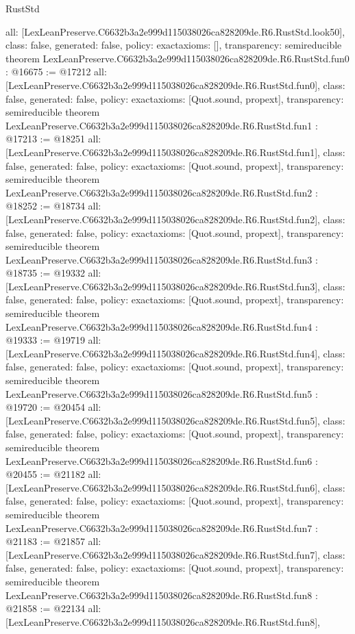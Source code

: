 \begin{lexlean}{RustStd}
\begin{coremodule}
{  all: [LexLeanPreserve.C6632b3a2e999d115038026ca828209de.R6.RustStd.look50],
  class: false,
  generated: false,
  policy: exact{axioms: []},
  transparency: semireducible
}
theorem LexLeanPreserve.C6632b3a2e999d115038026ca828209de.R6.RustStd.fun0 : @16675 := @17212 {
  all: [LexLeanPreserve.C6632b3a2e999d115038026ca828209de.R6.RustStd.fun0],
  class: false,
  generated: false,
  policy: exact{axioms: [Quot.sound, propext]},
  transparency: semireducible
}
theorem LexLeanPreserve.C6632b3a2e999d115038026ca828209de.R6.RustStd.fun1 : @17213 := @18251 {
  all: [LexLeanPreserve.C6632b3a2e999d115038026ca828209de.R6.RustStd.fun1],
  class: false,
  generated: false,
  policy: exact{axioms: [Quot.sound, propext]},
  transparency: semireducible
}
theorem LexLeanPreserve.C6632b3a2e999d115038026ca828209de.R6.RustStd.fun2 : @18252 := @18734 {
  all: [LexLeanPreserve.C6632b3a2e999d115038026ca828209de.R6.RustStd.fun2],
  class: false,
  generated: false,
  policy: exact{axioms: [Quot.sound, propext]},
  transparency: semireducible
}
theorem LexLeanPreserve.C6632b3a2e999d115038026ca828209de.R6.RustStd.fun3 : @18735 := @19332 {
  all: [LexLeanPreserve.C6632b3a2e999d115038026ca828209de.R6.RustStd.fun3],
  class: false,
  generated: false,
  policy: exact{axioms: [Quot.sound, propext]},
  transparency: semireducible
}
theorem LexLeanPreserve.C6632b3a2e999d115038026ca828209de.R6.RustStd.fun4 : @19333 := @19719 {
  all: [LexLeanPreserve.C6632b3a2e999d115038026ca828209de.R6.RustStd.fun4],
  class: false,
  generated: false,
  policy: exact{axioms: [Quot.sound, propext]},
  transparency: semireducible
}
theorem LexLeanPreserve.C6632b3a2e999d115038026ca828209de.R6.RustStd.fun5 : @19720 := @20454 {
  all: [LexLeanPreserve.C6632b3a2e999d115038026ca828209de.R6.RustStd.fun5],
  class: false,
  generated: false,
  policy: exact{axioms: [Quot.sound, propext]},
  transparency: semireducible
}
theorem LexLeanPreserve.C6632b3a2e999d115038026ca828209de.R6.RustStd.fun6 : @20455 := @21182 {
  all: [LexLeanPreserve.C6632b3a2e999d115038026ca828209de.R6.RustStd.fun6],
  class: false,
  generated: false,
  policy: exact{axioms: [Quot.sound, propext]},
  transparency: semireducible
}
theorem LexLeanPreserve.C6632b3a2e999d115038026ca828209de.R6.RustStd.fun7 : @21183 := @21857 {
  all: [LexLeanPreserve.C6632b3a2e999d115038026ca828209de.R6.RustStd.fun7],
  class: false,
  generated: false,
  policy: exact{axioms: [Quot.sound, propext]},
  transparency: semireducible
}
theorem LexLeanPreserve.C6632b3a2e999d115038026ca828209de.R6.RustStd.fun8 : @21858 := @22134 {
  all: [LexLeanPreserve.C6632b3a2e999d115038026ca828209de.R6.RustStd.fun8],
}
\end{coremodule}
\end{lexlean}
